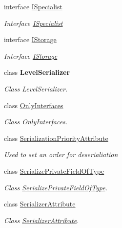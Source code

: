 \begin{DoxyCompactItemize}
interface \hyperlink{interface_serialization_1_1_i_specialist}{I\+Specialist}
\begin{DoxyCompactList}\small\item\em Interface \hyperlink{interface_serialization_1_1_i_specialist}{I\+Specialist} \end{DoxyCompactList}\item 
interface \hyperlink{interface_serialization_1_1_i_storage}{I\+Storage}
\begin{DoxyCompactList}\small\item\em Interface \hyperlink{interface_serialization_1_1_i_storage}{I\+Storage} \end{DoxyCompactList}\item 
class {\bfseries Level\+Serializer}
\begin{DoxyCompactList}\small\item\em Class Level\+Serializer. \end{DoxyCompactList}\item 
class \hyperlink{class_serialization_1_1_only_interfaces}{Only\+Interfaces}
\begin{DoxyCompactList}\small\item\em Class \hyperlink{class_serialization_1_1_only_interfaces}{Only\+Interfaces}. \end{DoxyCompactList}\item 
class \hyperlink{class_serialization_1_1_serialization_priority_attribute}{Serialization\+Priority\+Attribute}
\begin{DoxyCompactList}\small\item\em Used to set an order for deserialiation \end{DoxyCompactList}\item 
class \hyperlink{class_serialization_1_1_serialize_private_field_of_type}{Serialize\+Private\+Field\+Of\+Type}
\begin{DoxyCompactList}\small\item\em Class \hyperlink{class_serialization_1_1_serialize_private_field_of_type}{Serialize\+Private\+Field\+Of\+Type}. \end{DoxyCompactList}\item 
class \hyperlink{class_serialization_1_1_serializer_attribute}{Serializer\+Attribute}
\begin{DoxyCompactList}\small\item\em Class \hyperlink{class_serialization_1_1_serializer_attribute}{Serializer\+Attribute}. \end{DoxyCompactList}\item 

\end{DoxyCompactItemize}
